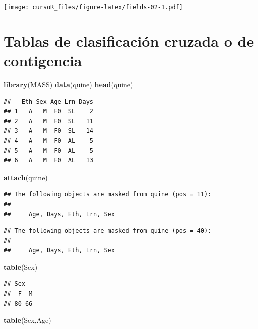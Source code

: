 \documentclass[]{book}
\newenvironment{Shaded}{\begin{snugshade}}{\end{snugshade}}
\newcommand{\KeywordTok}[1]{\textcolor[rgb]{0.13,0.29,0.53}{\textbf{#1}}}
\newcommand{\NormalTok}[1]{#1}
\begin{document}
\texttt{[image: cursoR\_files/figure-latex/fields-02-1.pdf]}

\section{Tablas de clasificación cruzada o de
contigencia}\label{tablas-de-clasificaciuxf3n-cruzada-o-de-contigencia}

\begin{Shaded}
\begin{Highlighting}[]
\KeywordTok{library}\NormalTok{(MASS)}
\KeywordTok{data}\NormalTok{(quine)}
\KeywordTok{head}\NormalTok{(quine)}
\end{Highlighting}
\end{Shaded}

\begin{verbatim}
##   Eth Sex Age Lrn Days
## 1   A   M  F0  SL    2
## 2   A   M  F0  SL   11
## 3   A   M  F0  SL   14
## 4   A   M  F0  AL    5
## 5   A   M  F0  AL    5
## 6   A   M  F0  AL   13
\end{verbatim}

\begin{Shaded}
\begin{Highlighting}[]
\KeywordTok{attach}\NormalTok{(quine)}
\end{Highlighting}
\end{Shaded}

\begin{verbatim}
## The following objects are masked from quine (pos = 11):
## 
##     Age, Days, Eth, Lrn, Sex
\end{verbatim}

\begin{verbatim}
## The following objects are masked from quine (pos = 40):
## 
##     Age, Days, Eth, Lrn, Sex
\end{verbatim}

\begin{Shaded}
\begin{Highlighting}[]
\KeywordTok{table}\NormalTok{(Sex)}
\end{Highlighting}
\end{Shaded}

\begin{verbatim}
## Sex
##  F  M 
## 80 66
\end{verbatim}

\begin{Shaded}
\begin{Highlighting}[]
\KeywordTok{table}\NormalTok{(Sex,Age)}
\end{Highlighting}
\end{Shaded}
\end{document}
